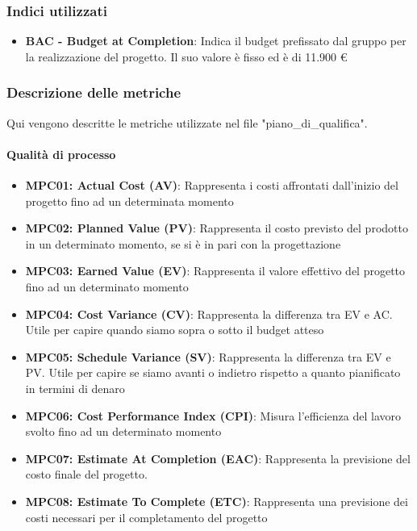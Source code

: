 \documentclass[12pt]{article}
\begin{document}
\subsubsection{Indici utilizzati}
\begin{itemize}
    \item \textbf{BAC - Budget at Completion}: Indica il budget prefissato dal gruppo per la realizzazione del progetto. Il suo valore è fisso ed è di 11.900 \euro
\end{itemize}

\subsubsection{Descrizione delle metriche}
Qui vengono descritte le metriche utilizzate nel file "piano\_di\_qualifica".

\paragraph{Qualità di processo}
\begin{itemize}
    \item \textbf{MPC01: Actual Cost (AV)}: Rappresenta i costi affrontati dall'inizio del progetto fino ad un determinata momento

    \item \textbf{MPC02: Planned Value (PV)}:  Rappresenta il costo previsto del prodotto in un determinato momento, se si è in pari con la progettazione

    \item \textbf{MPC03: Earned Value (EV)}:  Rappresenta il valore effettivo del progetto fino ad un determinato momento

    \item \textbf{MPC04: Cost Variance (CV)}:  Rappresenta la differenza tra EV e AC. Utile per capire quando siamo sopra o sotto il budget atteso

    \item \textbf{MPC05: Schedule Variance (SV)}:  Rappresenta la differenza tra EV e PV. Utile per capire se siamo avanti o indietro rispetto a quanto pianificato in termini di denaro

    \item \textbf{MPC06: Cost Performance Index (CPI)}: Misura l'efficienza del lavoro svolto fino ad un determinato momento

    \item \textbf{MPC07: Estimate At Completion (EAC)}: Rappresenta la previsione del costo finale del progetto.

    \item \textbf{MPC08: Estimate To Complete (ETC)}: Rappresenta una previsione dei costi necessari per il completamento del progetto
\end{itemize}
\end{document}
